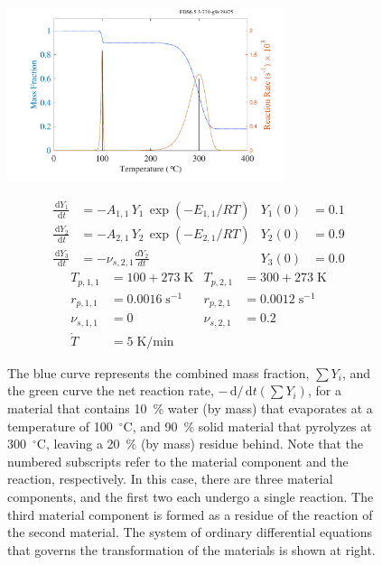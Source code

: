 \documentclass[11pt]{book}
\renewcommand{\d}{\,\mathrm{d}}
\begin{document}
\begin{figure}[ht]
\noindent
\begin{minipage}{0.5\textwidth}
\includegraphics[width=3.2in]{SCRIPT_FIGURES/pyrolysis_2}
\end{minipage}
\hfill
\begin{minipage}{0.5\textwidth}
\footnotesize
\begin{align*}
   \frac{\d Y_1}{\d t} &= -A_{1,1} \, Y_1 \, \exp(-E_{1,1}/RT)                  & Y_1(0) &=0.1 \\
   \frac{\d Y_2}{\d t} &= -A_{2,1} \, Y_2 \, \exp(-E_{2,1}/RT)                  & Y_2(0) &=0.9 \\
   \frac{\d Y_3}{\d t} &= -\nu_{s,2,1} \frac{dY_2}{dt}                          & Y_3(0) &=0.0
\end{align*}
\begin{align*}
   T_{p,1,1} &= 100+273 \; \mathrm{K}        & T_{p,2,1}   &= 300+273 \; \mathrm{K} \\
   r_{p,1,1} &= 0.0016 \; \mathrm{s}^{-1}    & r_{p,2,1}   &= 0.0012 \; \mathrm{s}^{-1} \\
   \nu_{s,1,1} &= 0                          & \nu_{s,2,1} &= 0.2 \\
   \dot{T} &= 5 \; \mathrm{K/min} & &
\end{align*}
\end{minipage} \normalsize
\caption[A more complicated demonstration of the pyrolysis model]{The blue curve represents the combined mass fraction,
$\sum Y_i$, and the green curve the net reaction rate, $-\d/\!\d t(\sum Y_i)$, for a material that contains
10~\% water (by mass) that evaporates at a temperature of 100~$^\circ$C,
and 90~\% solid material that pyrolyzes at 300~$^\circ$C, leaving a 20~\% (by mass) residue behind.
Note that the numbered subscripts refer
to the material component and the reaction, respectively. In this case, there are three material components,
and the first two each undergo a single
reaction. The third material component is formed as a residue of the reaction of the second material.
The system of ordinary differential equations that governs
the transformation of the materials is shown at right.}
\label{pyrolysis_2}
\end{figure}
\end{document}
